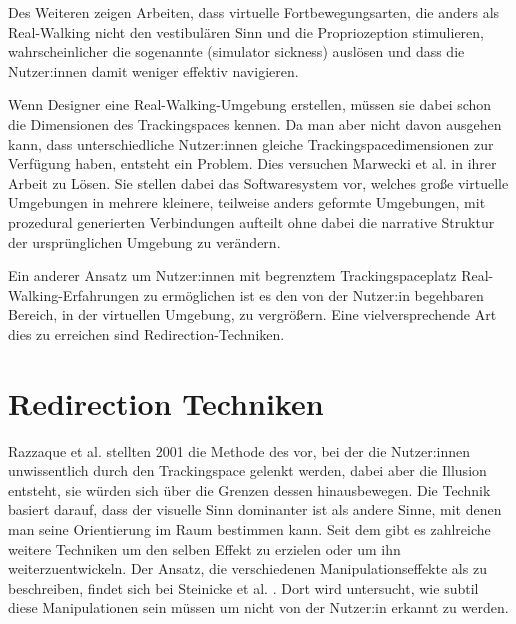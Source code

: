 Des Weiteren zeigen Arbeiten, dass virtuelle Fortbewegungsarten, die anders
als Real-Walking nicht den vestibulären Sinn und die Propriozeption stimulieren, wahrscheinlicher die sogenannte  (simulator sickness) auslösen \cite{locomotion-path-integration} und dass die Nutzer:innen damit weniger effektiv navigieren. \cite{benefits-real-walking}

Wenn Designer eine Real-Walking-Umgebung erstellen, müssen sie dabei schon die Dimensionen des Trackingspaces kennen. Da man aber nicht davon ausgehen kann, dass unterschiedliche Nutzer:innen gleiche Trackingspacedimensionen zur Verfügung haben, entsteht ein Problem. Dies versuchen Marwecki et al. in ihrer Arbeit \cite{scenograph} zu Lösen. Sie stellen dabei das Softwaresystem  vor, welches große virtuelle Umgebungen in mehrere kleinere, teilweise anders geformte Umgebungen, mit prozedural generierten Verbindungen aufteilt ohne dabei die narrative Struktur der ursprünglichen Umgebung zu verändern.

Ein anderer Ansatz um Nutzer:innen mit begrenztem Trackingspaceplatz Real-Walking-Erfahrungen zu ermöglichen ist es den von der Nutzer:in begehbaren Bereich, in der virtuellen Umgebung, zu vergrößern.
Eine vielversprechende Art dies zu erreichen sind Redirection-Techniken.

\section{Redirection Techniken}
Razzaque et al. \cite{rdw-razzaque} stellten 2001 die Methode des  vor, bei der die Nutzer:innen unwissentlich durch den Trackingspace gelenkt werden, dabei aber die Illusion entsteht, sie würden sich über die Grenzen dessen hinausbewegen. Die Technik basiert darauf, dass der visuelle Sinn dominanter ist als andere Sinne, mit denen man seine Orientierung im Raum bestimmen kann.
Seit dem gibt es zahlreiche weitere Techniken um den selben Effekt zu erzielen oder um ihn weiterzuentwickeln. Der Ansatz, die verschiedenen Manipulationseffekte als  zu beschreiben, findet sich bei Steinicke et al. \cite{detection-thresholds}. Dort wird untersucht, wie subtil diese Manipulationen sein müssen um nicht von der Nutzer:in erkannt zu werden.

